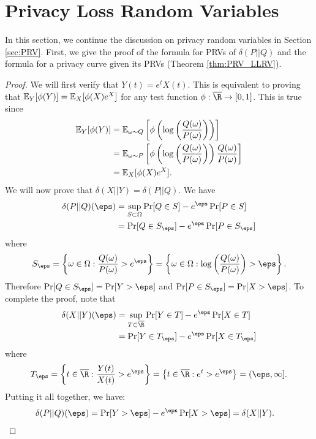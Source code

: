 \section{Privacy Loss Random Variables}
\label{sec:appendix_PRV}
In this section, we continue the discussion on privacy random variables in Section \ref{sec:PRV}. First, we give the proof of the formula for PRVs of $\delta(P||Q)$ and the formula for a privacy curve given its PRVs (Theorem \ref{thm:PRV_LLRV}).

{\renewcommand\footnote[1]{}\PRVLLRV*}
\begin{proof}
We will first verify that $Y(t)=e^t X(t).$ This is equivalent to proving that $\operatorname{\mathbb{E}}_Y[\phi(Y)]=\operatorname{\mathbb{E}}_X[\phi(X)e^X]$ for any test function $\phi:\bR \to [0,1]$. This is true since
	\begin{align*}
		\operatorname{\mathbb{E}}_Y[\phi(Y)]&= \operatorname{\mathbb{E}}_{\omega\sim Q}\left[ \phi\left(\log\left( \frac{Q(\omega)}{P(\omega)}\right)\right)\right] \\
		&= \operatorname{\mathbb{E}}_{\omega\sim P}\left[ \phi\left(\log\left( \frac{Q(\omega)}{P(\omega)}\right)\right) \frac{Q(\omega)}{P(\omega)}\right]\\
		&= \operatorname{\mathbb{E}}_X[\phi(X)e^X].
	\end{align*}
	We will now prove that $\delta(X||Y)=\delta(P||Q).$
	We have
	\begin{align*}
		\delta(P||Q)(\eps) &= \sup_{S \subset \Omega} \Pr[Q\in S] - e^\eps\Pr[P\in S]\\
		&= \Pr[Q\in S_\eps] - e^\eps\Pr[P\in S_\eps]
	\end{align*}
	where $$S_\eps = \left\{\omega\in \Omega: \frac{Q(\omega)}{P(\omega)} > e^\eps \right\}=\left\{\omega\in \Omega: \log\lp\frac{Q(\omega)}{P(\omega)}\rp > \eps \right\}.$$ 
	Therefore $\Pr[Q\in S_\eps]=\Pr[Y > \eps]$ and $\Pr[P\in S_\eps]=\Pr[X > \eps]$. To complete the proof, note that 
	\begin{align*}
		\delta(X||Y)(\eps) &= \sup_{T \subset \bR} \Pr[Y\in T] - e^\eps\Pr[X\in T]\\
		&= \Pr[Y\in T_\eps] - e^\eps\Pr[X\in T_\eps]
	\end{align*}
	where $$T_\eps = \left\{t\in \bR: \frac{Y(t)}{X(t)} > e^\eps \right\}= \left\{t\in \bR: e^t > e^\eps \right\}=(\eps,\infty].$$
	Putting it all together, we have:
	\begin{align*}
		\delta(P||Q)(\eps)&=\Pr[Y>\eps] - e^\eps \Pr[X>\eps]=\delta(X||Y).
	\end{align*}

\end{proof}
